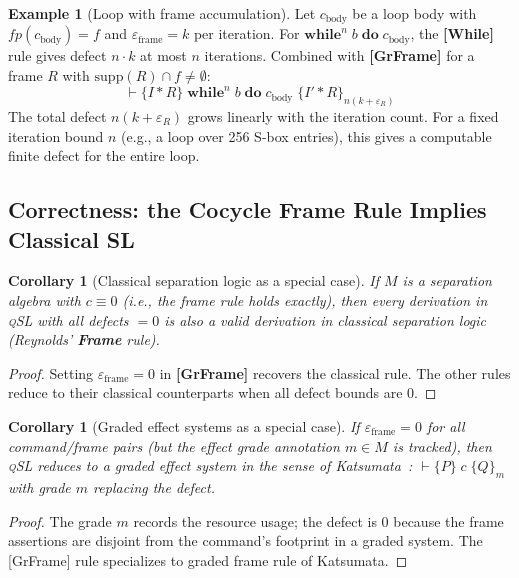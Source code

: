 \documentclass[acmsmall,sigplan,anonymous,review,screen]{acmart}
\theoremstyle{plain}
\newtheorem{corollary}[theorem]{Corollary}
\theoremstyle{definition}
\newtheorem{example}[theorem]{Example}
\newcommand{\qSL}{\textsc{qSL}\xspace}
\newcommand{\fp}{\mathit{fp}}
\newcommand{\sep}{*}
\newcommand{\defect}{\varepsilon}
\begin{document}
\begin{example}[Loop with frame accumulation]
\label{ex:loop-frame}
  Let $c_{\mathrm{body}}$ be a loop body with $\fp(c_{\mathrm{body}}) = f$
  and $\defect_{\mathrm{frame}} = k$ per iteration.  For
  $\mathbf{while}^n\; b\; \mathbf{do}\; c_{\mathrm{body}}$, the
  \textbf{[While]} rule gives defect $n \cdot k$ at most $n$ iterations.
  Combined with \textbf{[GrFrame]} for a frame $R$ with $\mathrm{supp}(R) \cap f \neq \emptyset$:
  \[
    \vdash \{I \sep R\}\; \mathbf{while}^n\; b\; \mathbf{do}\; c_{\mathrm{body}}\; \{I' \sep R\}_{n(k + \defect_R)}
  \]
  The total defect $n(k + \defect_R)$ grows linearly with the iteration
  count.  For a fixed iteration bound $n$ (e.g., a loop over 256 S-box
  entries), this gives a computable finite defect for the entire loop.
\end{example}

\subsection{Correctness: the Cocycle Frame Rule Implies Classical SL}
\label{sec:qsl:classical}

\begin{corollary}[Classical separation logic as a special case]
\label{cor:sl}
  If $M$ is a separation algebra with $c \equiv 0$ (i.e., the frame rule
  holds exactly), then every derivation in \qSL with all defects $= 0$ is
  also a valid derivation in classical separation logic (Reynolds'
  \textbf{Frame} rule).
\end{corollary}
\begin{proof}
  Setting $\defect_{\mathrm{frame}} = 0$ in \textbf{[GrFrame]} recovers
  the classical rule.  The other rules reduce to their classical
  counterparts when all defect bounds are 0.
\end{proof}

\begin{corollary}[Graded effect systems as a special case]
\label{cor:graded}
  If $\defect_{\mathrm{frame}} = 0$ for all command/frame pairs (but
  the effect grade annotation $m \in M$ is tracked), then \qSL reduces
  to a graded effect system in the sense of Katsumata~\cite{katsumata2014parametric}:
  $\vdash \{P\}\; c\; \{Q\}_m$ with grade $m$ replacing the defect.
\end{corollary}
\begin{proof}
  The grade $m$ records the resource usage; the defect is 0 because the
  frame assertions are disjoint from the command's footprint in a graded
  system.  The [GrFrame] rule specializes to graded frame rule of Katsumata.
\end{proof}
\end{document}
